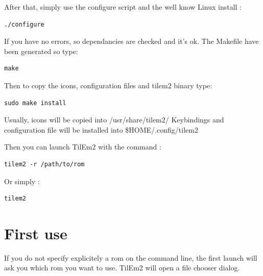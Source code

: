 \documentclass[10pt]{report}
\begin{document}
After that, simply use the configure script and the well know Linux install :\newline
\begin{lstlisting}
./configure
\end{lstlisting}
If you have no errors, so dependancies are checked and it's ok.\newline
The Makefile have been generated so type:\newline
\begin{lstlisting}
make
\end{lstlisting}
Then to copy the icons, configuration files and tilem2 binary type:\newline
\begin{lstlisting}
sudo make install
\end{lstlisting}

Usually, icons will be copied into /usr/share/tilem2/\newline
Keybindings and configuration file will be installed into \$HOME/.config/tilem2\newline

Then you can launch TilEm2 with the command :\newline
\begin{lstlisting}
tilem2 -r /path/to/rom
\end{lstlisting}

Or simply :\newline
\begin{lstlisting}
tilem2
\end{lstlisting}

\section{First use}
If you do not specify explicitely a rom on the command line, the first launch will ask you which rom you want to use.\newline
TilEm2 will open a file chooser dialog.\newline
\end{document}
